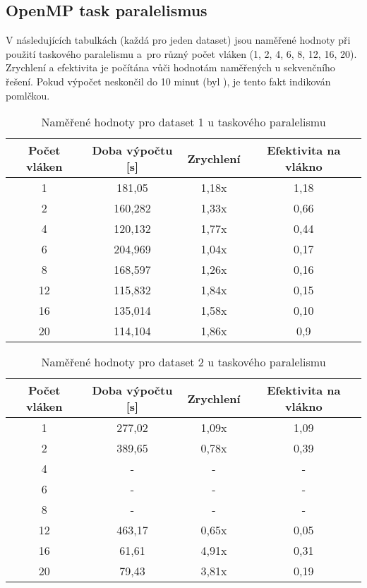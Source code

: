 \documentclass[a4paper,10pt]{article}
\begin{document}
\subsection*{OpenMP task paralelismus}
V následujících tabulkách (každá pro jeden dataset) jsou naměřené hodnoty při použití taskového paralelismu a~pro různý počet vláken (1, 2, 4, 6, 8, 12, 16, 20). Zrychlení a efektivita je počítána vůči hodnotám naměřených u sekvenčního řešení. Pokud výpočet neskončil do 10 minut (byl ), je tento fakt indikován pomlčkou.

\begin{table}[H]
\centering
\begin{tabular}{|c|c|c|c|}
\hline
Počet vláken & Doba výpočtu {[}s{]} & Zrychlení & Efektivita na vlákno \\ \hline
1            & 181,05               & 1,18x     & 1,18                 \\
2            & 160,282              & 1,33x     & 0,66                 \\
4            & 120,132              & 1,77x     & 0,44                 \\
6            & 204,969              & 1,04x     & 0,17                 \\
8            & 168,597              & 1,26x     & 0,16                 \\
12           & 115,832              & 1,84x     & 0,15                 \\
16           & 135,014              & 1,58x     & 0,10                 \\
20           & 114,104              & 1,86x     & 0,9                  \\ \hline
\end{tabular}
\caption{Naměřené hodnoty pro dataset 1 u taskového paralelismu}
\end{table}

\begin{table}[H]
\centering
\begin{tabular}{|c|c|c|c|}
\hline
Počet vláken & Doba výpočtu {[}s{]} & Zrychlení & Efektivita na vlákno \\ \hline
1            & 277,02               & 1,09x     & 1,09                 \\
2            & 389,65               & 0,78x     & 0,39                 \\
4            & -                    & -         & -                    \\
6            & -                    & -         & -                    \\
8            & -                    & -         & -                    \\
12           & 463,17               & 0,65x     & 0,05                 \\
16           & 61,61                & 4,91x     & 0,31                 \\
20           & 79,43                & 3,81x     & 0,19                 \\ \hline
\end{tabular}
\caption{Naměřené hodnoty pro dataset 2 u taskového paralelismu}
\end{table}
\end{document}
